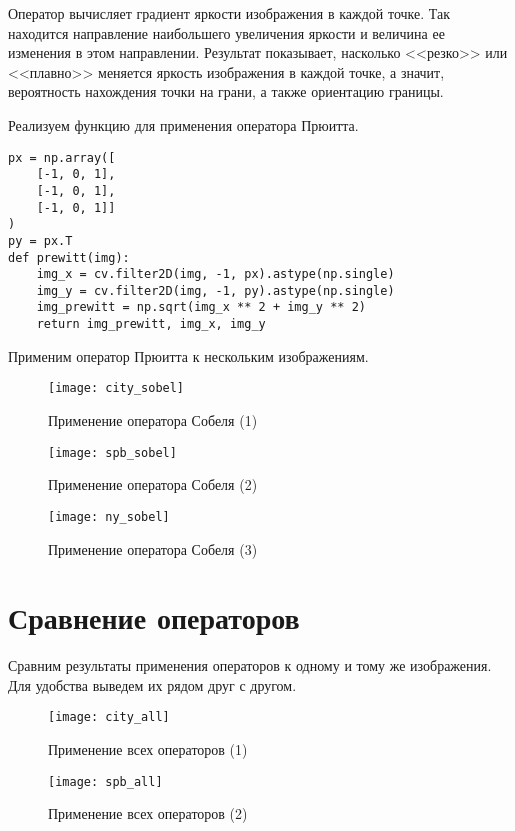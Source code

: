 {Оператор вычисляет градиент яркости изображения в каждой точке. Так находится направление наибольшего увеличения яркости и величина ее изменения в этом направлении. Результат показывает, насколько <<резко>> или <<плавно>> меняется яркость изображения в каждой точке, а значит, вероятность нахождения точки на грани, а также ориентацию границы.

Реализуем функцию для применения оператора Прюитта.

\begin{lstlisting}[caption={Применение оператора Собеля}]
px = np.array([
    [-1, 0, 1],
    [-1, 0, 1],
    [-1, 0, 1]]
)
py = px.T
def prewitt(img):
    img_x = cv.filter2D(img, -1, px).astype(np.single)
    img_y = cv.filter2D(img, -1, py).astype(np.single)
    img_prewitt = np.sqrt(img_x ** 2 + img_y ** 2)
    return img_prewitt, img_x, img_y
\end{lstlisting}

Применим оператор Прюитта к нескольким изображениям.

\begin{figure}[H]
	\centering
	\texttt{[image: city\_sobel]}
	\caption{Применение оператора Собеля (1)}
\end{figure}

\begin{figure}[H]
	\centering
	\texttt{[image: spb\_sobel]}
	\caption{Применение оператора Собеля (2)}
\end{figure}

\begin{figure}[H]
	\centering
	\texttt{[image: ny\_sobel]}
	\caption{Применение оператора Собеля (3)}
\end{figure}

\section{Сравнение операторов}

Сравним результаты применения операторов к одному и тому же изображения. Для удобства выведем их рядом друг с другом.

\begin{figure}[H]
	\centering
	\texttt{[image: city\_all]}
	\caption{Применение всех операторов (1)}
\end{figure}

\begin{figure}[H]
	\centering
	\texttt{[image: spb\_all]}
	\caption{Применение всех операторов (2)}
\end{figure}

}
